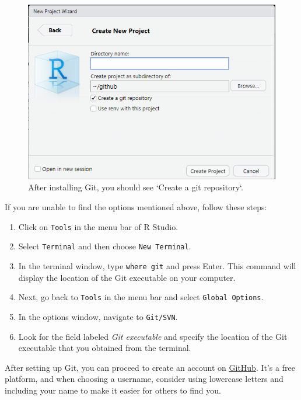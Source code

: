 \documentclass[
]{article}
\providecommand{\tightlist}{%
  \setlength{\itemsep}{0pt}\setlength{\parskip}{0pt}}
\begin{document}
\begin{figure}

{\centering \includegraphics[width=8.24in]{image/git_image01} 

}

\caption{After installing Git, you should see `Create a git repository`.}\label{fig:gitcheck}
\end{figure}

If you are unable to find the options mentioned above, follow these steps:

\begin{enumerate}
\def\labelenumi{\arabic{enumi}.}
\tightlist
\item
  Click on \texttt{Tools} in the menu bar of R Studio.
\item
  Select \texttt{Terminal} and then choose \texttt{New\ Terminal}.
\item
  In the terminal window, type \texttt{where\ git} and press Enter. This command will display the location of the Git executable on your computer.
\item
  Next, go back to \texttt{Tools} in the menu bar and select \texttt{Global\ Options}.
\item
  In the options window, navigate to \texttt{Git/SVN}.
\item
  Look for the field labeled \emph{Git executable} and specify the location of the Git executable that you obtained from the terminal.
\end{enumerate}

After setting up Git, you can proceed to create an account on \href{https://github.com/}{GitHub}. It's a free platform, and when choosing a username, consider using lowercase letters and including your name to make it easier for others to find you.
\end{document}

